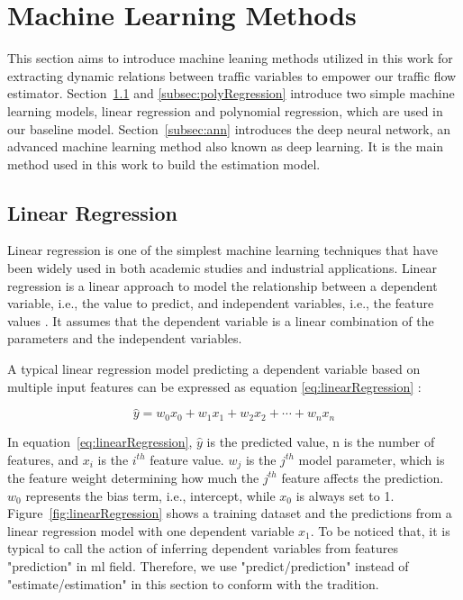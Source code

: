 \documentclass[english]{kththesis}
\begin{document}
\section{Machine Learning Methods}
\label{sec:ml}
This section aims to introduce machine leaning methods utilized in this work for extracting dynamic relations between traffic variables to empower our traffic flow estimator. Section~\ref{subsec:linearRegression} and \ref{subsec:polyRegression} introduce two simple machine learning models, linear regression and polynomial regression, which are used in our baseline model. Section~\ref{subsec:ann} introduces the deep neural network, an advanced machine learning method also known as deep learning. It is the main method used in this work to build the estimation model.

\subsection{Linear Regression}
\label{subsec:linearRegression}
Linear regression is one of the simplest machine learning techniques that have been widely used in both academic studies and industrial applications. Linear regression is a linear approach to model the relationship between a dependent variable, i.e., the value to predict, and independent variables, i.e., the feature values \cite{wiki_linearRegression, geron_handson_ml}. It assumes that the dependent variable is a linear combination of the parameters and the independent variables.

A typical linear regression model predicting a dependent variable based on multiple input features can be expressed as equation \ref{eq:linearRegression} \cite{geron_handson_ml}:

\begin{equation}
    \hat{y} = w_0 x_0 + w_1 x_1 + w_2 x_2 + \cdots + w_n x_n
    \label{eq:linearRegression}
\end{equation}

In equation~\ref{eq:linearRegression}, $\hat{y}$ is the predicted value, n is the number of features, and $x_i$ is the $i^{th}$ feature value. $w_j$ is the $j^{th}$ model parameter, which is the feature weight determining how much the $j^{th}$ feature affects the prediction. $w_0$ represents the bias term, i.e., intercept, while $x_0$ is always set to 1. Figure~\ref{fig:linearRegression} shows a training dataset and the predictions from a linear regression model with one dependent variable $x_1$. To be noticed that, it is typical to call the action of inferring dependent variables from features "prediction" in \gls{ml} field. Therefore, we use "predict/prediction" instead of "estimate/estimation" in this section to conform with the tradition.
\end{document}
